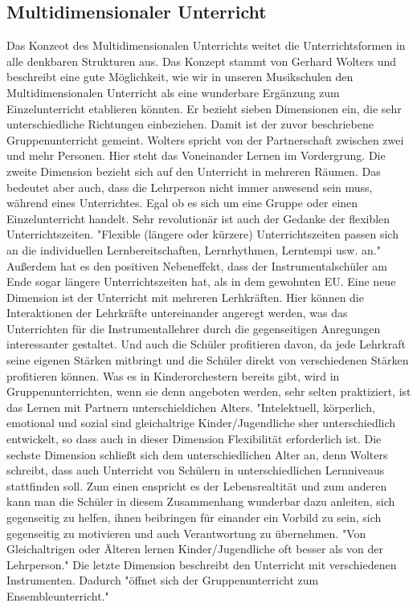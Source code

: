 \subsection{Multidimensionaler Unterricht} 
Das Konzeot des Multidimensionalen Unterrichts weitet die Unterrichtsformen in
alle denkbaren Strukturen aus. Das Konzept stammt von Gerhard Wolters und
beschreibt eine gute Möglichkeit, wie wir in unseren Musikschulen den
Multidimensionalen Unterricht als eine wunderbare Ergänzung zum Einzelunterricht
etablieren könnten. Er bezieht sieben Dimensionen ein, die sehr unterschiedliche
Richtungen einbeziehen. \autocite[86ff]{ernst:die_zukunftsfaehige_musikschule} Damit
ist der zuvor beschriebene Gruppenunterricht gemeint. Wolters
spricht von der Partnerschaft zwischen zwei und mehr Personen. Hier steht das
Voneinander Lernen im Vordergrung. Die zweite Dimension bezieht sich auf den
Unterricht in mehreren Räumen. Das bedeutet aber auch, dass die Lehrperson nicht
immer anwesend sein muss, während eines Unterrichtes. Egal ob es sich um eine
Gruppe oder einen Einzelunterricht handelt. Sehr revolutionär ist auch der
Gedanke der flexiblen Unterrichtszeiten. "Flexible (längere oder kürzere)
Unterrichtszeiten passen sich an die individuellen Lernbereitschaften,
Lernrhythmen, Lerntempi usw. an."
\autocite[87]{ernst:die_zukunftsfaehige_musikschule} Außerdem hat es den
positiven Nebeneffekt, dass der Instrumentalschüler am Ende sogar längere
Unterrichtszeiten hat, als in dem gewohnten EU. Eine neue Dimension ist der
Unterricht mit mehreren Lerhkräften. Hier können die Interaktionen der
Lehrkräfte untereinander angeregt werden, was das Unterrichten für die
Instrumentallehrer durch die gegenseitigen Anregungen interessanter gestaltet.
Und auch die Schüler profitieren davon, da jede Lehrkraft seine eigenen Stärken
mitbringt und die Schüler direkt von verschiedenen Stärken profitieren können.
Was es in Kinderorchestern bereits gibt, wird in Gruppenunterrichten, wenn sie
denn angeboten werden, sehr selten praktiziert, ist das Lernen mit Partnern
unterschieldichen Alters. "Intelektuell, körperlich, emotional und sozial sind
gleichaltrige Kinder/Jugendliche sher unterschiedlich entwickelt, so dass auch
in dieser Dimension Flexibilität erforderlich ist. \autocite[87]{ernst:die_zukunftsfaehige_musikschule}
Die sechste Dimension schließt sich dem unterschiedlichen Alter an, denn Wolters
schreibt, dass auch Unterricht von Schülern in unterschiedlichen Lernniveaus
stattfinden soll. Zum einen enspricht es der Lebensrealtität und zum anderen
kann man die Schüler in diesem Zusammenhang wunderbar dazu anleiten, sich
gegenseitig zu helfen, ihnen beibringen für einander ein Vorbild zu sein, sich
gegenseitig zu motivieren und auch Verantwortung zu übernehmen. "Von
Gleichaltrigen oder Älteren lernen Kinder/Jugendliche oft besser als von der
Lehrperson." \autocite[87]{ernst:die_zukunftsfaehige_musikschule} Die letzte
Dimension beschreibt den Unterricht mit verschiedenen Instrumenten. Dadurch
"öffnet sich der Gruppenunterricht zum Ensembleunterricht."
\autocite[87]{ernst:die_zukunftsfaehige_musikschule}
